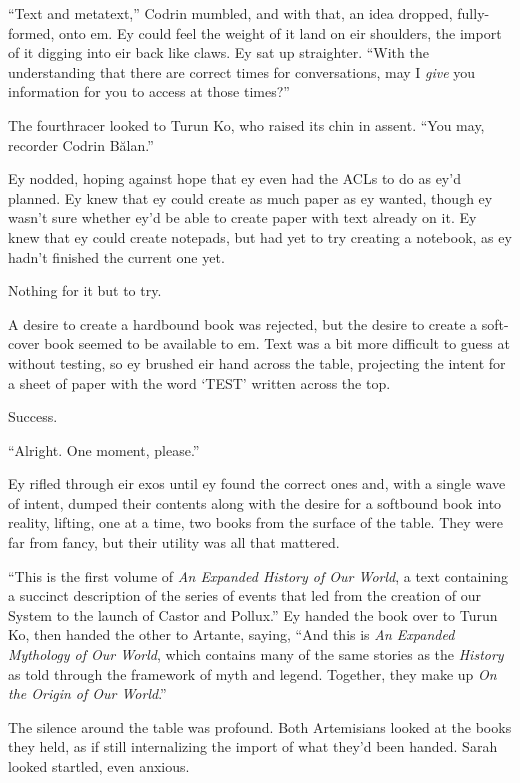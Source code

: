``Text and metatext,'' Codrin mumbled, and with that, an idea dropped, fully-formed, onto em. Ey could feel the weight of it land on eir shoulders, the import of it digging into eir back like claws. Ey sat up straighter. ``With the understanding that there are correct times for conversations, may I \emph{give} you information for you to access at those times?''

The fourthracer looked to Turun Ko, who raised its chin in assent. ``You may, recorder Codrin Bălan.''

Ey nodded, hoping against hope that ey even had the ACLs to do as ey'd planned. Ey knew that ey could create as much paper as ey wanted, though ey wasn't sure whether ey'd be able to create paper with text already on it. Ey knew that ey could create notepads, but had yet to try creating a notebook, as ey hadn't finished the current one yet.

Nothing for it but to try.

A desire to create a hardbound book was rejected, but the desire to create a soft-cover book seemed to be available to em. Text was a bit more difficult to guess at without testing, so ey brushed eir hand across the table, projecting the intent for a sheet of paper with the word `TEST' written across the top.

Success.

``Alright. One moment, please.''

Ey rifled through eir exos until ey found the correct ones and, with a single wave of intent, dumped their contents along with the desire for a softbound book into reality, lifting, one at a time, two books from the surface of the table. They were far from fancy, but their utility was all that mattered.

``This is the first volume of \emph{An Expanded History of Our World}, a text containing a succinct description of the series of events that led from the creation of our System to the launch of Castor and Pollux.'' Ey handed the book over to Turun Ko, then handed the other to Artante, saying, ``And this is \emph{An Expanded Mythology of Our World}, which contains many of the same stories as the \emph{History} as told through the framework of myth and legend. Together, they make up \emph{On the Origin of Our World}.''

The silence around the table was profound. Both Artemisians looked at the books they held, as if still internalizing the import of what they'd been handed. Sarah looked startled, even anxious.

